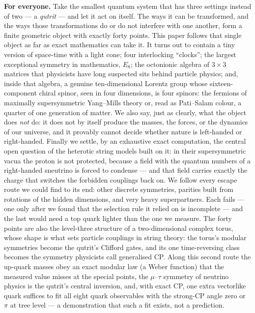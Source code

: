 \documentclass[11pt,twoside]{article}
\theoremstyle{plain}
\theoremstyle{definition}
\theoremstyle{remark}
\begin{document}
\textbf{For everyone.} Take the smallest quantum system that has three settings
instead of two --- a \emph{qutrit} --- and let it act on itself. The ways it can be
transformed, and the ways those transformations do or do not interfere with one
another, form a finite geometric object with exactly forty points. This paper follows
that single object as far as exact mathematics can take it. It turns out to contain
a tiny version of space-time with a light cone; four interlocking ``clocks''; the
largest exceptional symmetry in mathematics, $E_8$; the octonionic algebra of
$3\times3$ matrices that physicists have long suspected sits behind particle physics;
and, inside that algebra, a genuine ten-dimensional Lorentz group whose sixteen-component
chiral spinor, seen in four dimensions, is four spinors: the fermions of maximally
supersymmetric Yang--Mills theory or, read as Pati--Salam colour, a quarter of one
generation of matter. We also say, just as clearly, what the
object does \emph{not} do: it does not by itself produce the masses, the forces, or
the dynamics of our universe, and it provably cannot decide whether nature is
left-handed or right-handed. Finally we settle, by an exhaustive exact computation, the
central open question of the heterotic string models built on it: in their
supersymmetric vacua the proton is not protected, because a field with the quantum numbers
of a right-handed sneutrino is forced to condense --- and that field carries exactly the charge
that switches the forbidden couplings back on. We follow every escape route we could find to
its end: other discrete symmetries, parities built from rotations of the hidden dimensions,
and very heavy superpartners. Each fails --- one only after we found that the selection rule it
relied on is incomplete --- and the last would need a top quark lighter than the one we measure.
The forty points are also the level-three structure of a two-dimensional complex torus, whose
shape is what sets particle couplings in string theory: the torus's modular symmetries become the
qutrit's Clifford gates, and its one time-reversing class becomes the symmetry physicists call
generalised CP. Along this second route the up-quark masses obey an exact modular law (a Weber
function) that the measured value misses at the special points, the $\mu$--$\tau$ symmetry of
neutrino physics is the qutrit's central inversion, and, with exact CP, one extra vectorlike quark
suffices to fit all eight quark observables with the strong-CP angle zero or $\pi$ at tree level
--- a demonstration that such a fit exists, not a prediction.
\end{document}
